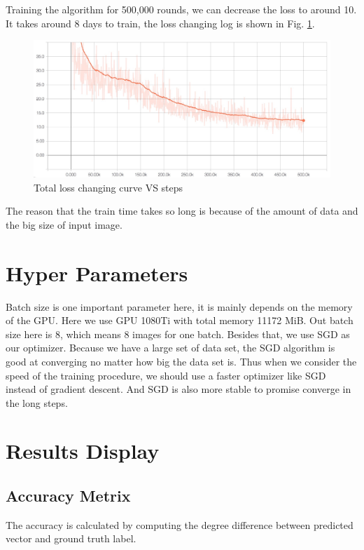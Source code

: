 \documentclass[senior]{IPSstyle}
\begin{document}
Training the algorithm for 500,000 rounds, we can decrease the loss to around 10.
It takes around 8 days to train, the loss changing log is shown in Fig. \ref{fig:loss}.
\begin{figure}
    \centering
    \includegraphics[width=15cm]{MasterThesis-master/images/loss.jpg}
    \caption{Total loss changing curve VS steps}
    \label{fig:loss}
\end{figure}
The reason that the train time takes so long is because of the amount of data and the big size of input image.


\section{Hyper Parameters}
Batch size is one important parameter here, it is mainly depends on the memory of the GPU.
Here we use GPU 1080Ti with total memory 11172 MiB.
Out batch size here is 8, which means 8 images for one batch.
Besides that, we use SGD as our optimizer\cite{bottou2010large}.
Because we have a large set of data set, the SGD algorithm is good at converging no matter how big the data set is.
Thus when we consider the speed of the training procedure, we should use a faster optimizer like SGD instead of gradient descent.
And SGD is also more stable to promise converge in the long steps.



\section{Results Display}
\subsection{Accuracy Metrix}
The accuracy is calculated by computing the degree difference between predicted vector and ground truth label.
\end{document}
